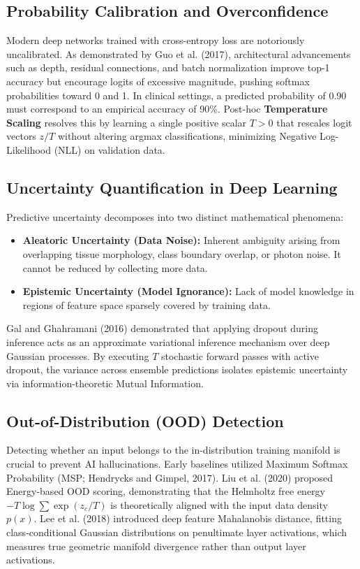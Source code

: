 \documentclass[11pt,a4paper]{article}
\begin{document}
\subsection{Probability Calibration and Overconfidence}
Modern deep networks trained with cross-entropy loss are notoriously uncalibrated. As demonstrated by Guo et al. (2017), architectural advancements such as depth, residual connections, and batch normalization improve top-1 accuracy but encourage logits of excessive magnitude, pushing softmax probabilities toward 0 and 1. In clinical settings, a predicted probability of 0.90 must correspond to an empirical accuracy of 90\%. Post-hoc \textbf{Temperature Scaling} resolves this by learning a single positive scalar $T > 0$ that rescales logit vectors $z / T$ without altering argmax classifications, minimizing Negative Log-Likelihood (NLL) on validation data.

\subsection{Uncertainty Quantification in Deep Learning}
Predictive uncertainty decomposes into two distinct mathematical phenomena:
\begin{itemize}[leftmargin=*]
    \item \textbf{Aleatoric Uncertainty (Data Noise):} Inherent ambiguity arising from overlapping tissue morphology, class boundary overlap, or photon noise. It cannot be reduced by collecting more data.
    \item \textbf{Epistemic Uncertainty (Model Ignorance):} Lack of model knowledge in regions of feature space sparsely covered by training data. 
\end{itemize}
Gal and Ghahramani (2016) demonstrated that applying dropout during inference acts as an approximate variational inference mechanism over deep Gaussian processes. By executing $T$ stochastic forward passes with active dropout, the variance across ensemble predictions isolates epistemic uncertainty via information-theoretic Mutual Information.

\subsection{Out-of-Distribution (OOD) Detection}
Detecting whether an input belongs to the in-distribution training manifold is crucial to prevent AI hallucinations. Early baselines utilized Maximum Softmax Probability (MSP; Hendrycks and Gimpel, 2017). Liu et al. (2020) proposed Energy-based OOD scoring, demonstrating that the Helmholtz free energy $-T \log \sum \exp(z_c / T)$ is theoretically aligned with the input data density $p(x)$. Lee et al. (2018) introduced deep feature Mahalanobis distance, fitting class-conditional Gaussian distributions on penultimate layer activations, which measures true geometric manifold divergence rather than output layer activations.
\end{document}
